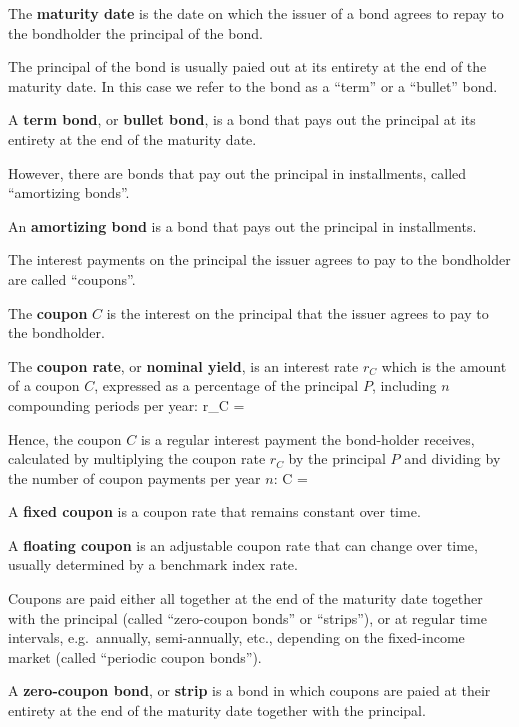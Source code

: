 The \textbf{maturity date} is the date on which the issuer of a bond agrees to repay to the bondholder the principal
of the bond.
\ed

The principal of the bond is usually paied out at its entirety at the end of the maturity date. In this case we refer
to the bond as a ``term'' or a ``bullet'' bond.

A \textbf{term bond}, or \textbf{bullet bond}, is a bond that pays out the principal at its entirety at the end of the
maturity date.
\ed

However, there are bonds that pay out the principal in installments, called ``amortizing bonds''.

An \textbf{amortizing bond} is a bond that pays out the principal in installments.
\ed

The interest payments on the principal the issuer agrees to pay to the bondholder are called ``coupons''.

\bd[Coupon]
The \textbf{coupon} $C$ is the interest on the principal that the issuer agrees to pay to the bondholder.
\ed

The \textbf{coupon rate}, or \textbf{nominal yield}, is an interest rate $r_C$ which is the amount of a coupon $C$,
expressed as a percentage of the principal $P$, including $n$ compounding periods per year:
\bse
r_C = 
\ese
\ed

Hence, the coupon $C$ is a regular interest payment the bond-holder receives, calculated by multiplying the coupon
rate $r_C$ by the principal $P$ and dividing by the number of coupon payments per year $n$:
\bse
C = 
\ese

A \textbf{fixed coupon} is a coupon rate that remains constant over time.
\ed

A \textbf{floating coupon} is an adjustable coupon rate that can change over time, usually determined by a benchmark
index rate.
\ed

Coupons are paid either all together at the end of the maturity date together with the principal (called ``zero-coupon
bonds'' or ``strips''), or at regular time intervals, e.g.\ annually, semi-annually, etc., depending on the
fixed-income market (called ``periodic coupon bonds'').

A \textbf{zero-coupon bond}, or \textbf{strip} is a bond in which coupons are paied at their entirety at the end of the
maturity date together with the principal.
\ed

